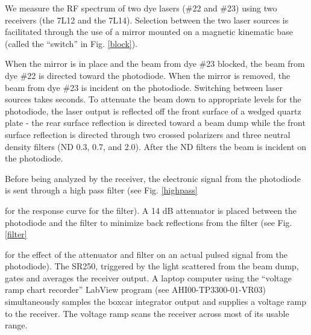 We measure the RF spectrum of two dye lasers (\#22 and \#23) using two receivers (the 7L12 and the 7L14). Selection between the two laser sources is facilitated through the use of a mirror mounted on a magnetic kinematic base (called the ``switch'' in Fig. \ref{block}).

When the mirror is in place and the beam from dye \#23 blocked, the beam from dye \#22 is directed toward the photodiode. When the mirror is removed, the beam from dye \#23 is incident on the photodiode. Switching between laser sources takes seconds. To attenuate the beam down to appropriate levels for the photodiode, the laser output is reflected off the front surface of a wedged quartz plate - the rear surface reflection is directed toward a beam dump while the front surface reflection is directed through two crossed polarizers and three neutral density filters (ND 0.3, 0.7, and 2.0). After the ND filters the beam is incident on the photodiode.

Before being analyzed by the receiver, the electronic signal from the photodiode is sent through a high pass filter (see Fig. \ref{highpass}

 for the response curve for the filter). A 14 dB attenuator is placed between the photodiode and the filter to minimize back reflections from the filter (see Fig. \ref{filter}

for the effect of the attenuator and filter on an actual pulsed signal from the photodiode). The SR250, triggered by the light scattered from the beam dump, gates and averages the receiver output. A laptop computer using the ``voltage ramp chart recorder'' LabView program (see AHI00-TP3300-01-VR03) simultaneously samples the boxcar integrator output and supplies a voltage ramp to the receiver. The voltage ramp scans the receiver across most of its usable range.

